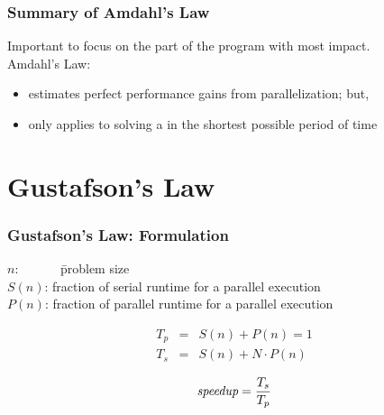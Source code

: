 \documentclass[aspectratio=43]{beamer}
\begin{document}
\begin{frame}
  \frametitle{Summary of Amdahl's Law}

\hspace*{2em} Important to focus on the part of the program with most impact.\\[1em]

\hspace*{2em} Amdahl's Law:\\[1em]
\hspace*{2em} \begin{minipage}{.8\textwidth}
  \begin{itemize}
    \item estimates perfect performance gains from
          parallelization; but,
    \vfill
    \item only applies to solving a  in the
          shortest possible period of time
  \end{itemize} \end{minipage}
\end{frame}

\section{Gustafson's Law}
\begin{frame}
  \frametitle{Gustafson's Law: Formulation}

\hspace*{2em} \begin{minipage}{.8\textwidth}
\begin{tabbing}
  $n$:~~~~~~ \= problem size\\[.1em]

  $S(n)$: \> fraction of serial runtime for a parallel execution\\[.1em]

  $P(n)$: \> fraction of parallel runtime for a parallel execution\\
\end{tabbing}
\end{minipage}

\begin{eqnarray*}
T_p &=& S(n) + P(n) = 1 \\
T_s &=& S(n) + N \cdot P(n) 
\end{eqnarray*}

\[ \mbox{\em speedup} = \frac{T_s}{T_p} \]
\end{frame}
\end{document}
